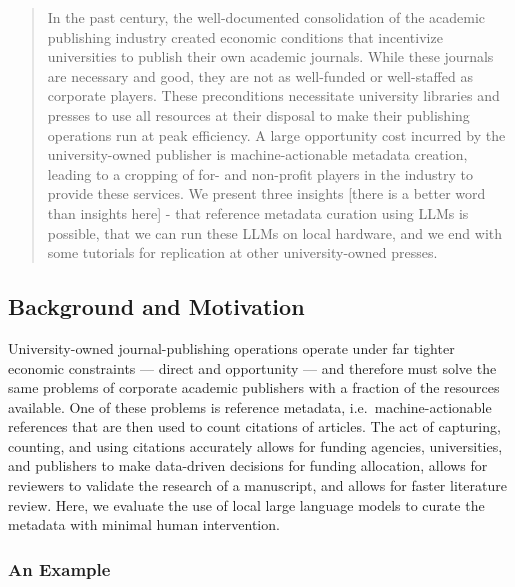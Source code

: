 \documentclass{article}
\begin{document}
\begin{abstract}
In the past century, the well-documented consolidation of the academic 
publishing industry created economic conditions that incentivize universities 
to publish their own academic journals. While these journals are necessary and good, 
they are not as well-funded or well-staffed as corporate players. These preconditions 
necessitate university libraries and presses to use all resources at their 
disposal to make their publishing operations run at peak efficiency. A 
large opportunity cost incurred by the university-owned publisher is 
machine-actionable metadata creation, leading to a cropping of for- and 
non-profit players in the industry to provide these services. We present 
three insights [there is a better word than insights here] - 
that reference metadata curation using LLMs is possible, that we can run 
these LLMs on local hardware, and we end with some tutorials for replication 
at other university-owned presses.  
\end{abstract}

\subsection{Background and Motivation}\label{background-and-motivation}

University-owned journal-publishing operations operate under far tighter
economic constraints --- direct and opportunity --- and therefore must
solve the same problems of corporate academic publishers with a fraction
of the resources available. One of these problems is reference metadata,
i.e.~machine-actionable references that are then used to count citations
of articles. The act of capturing, counting, and using citations accurately 
allows for funding agencies, universities, and publishers to make data-driven 
decisions for funding allocation, allows for reviewers to validate the 
research of a manuscript, and allows for faster literature review. Here, 
we evaluate the use of local large language models to curate the metadata 
with minimal human intervention.

\subsubsection{An Example}\label{an-example}
\end{document}
